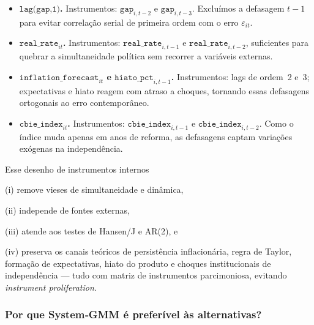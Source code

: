 \documentclass[a4paper,12pt]{article}[abnt2]
\begin{document}
\begin{itemize}
  \item \textbf{\(\texttt{lag(gap,1)}\).}  
        Instrumentos: \(\texttt{gap}_{i,t-2}\) e \(\texttt{gap}_{i,t-3}\).  
        Excluímos a defasagem \(t-1\) para evitar correlação serial de
        primeira ordem com o erro \(\varepsilon_{it}\).

  \item \textbf{\(\texttt{real\_rate}_{it}\).}  
        Instrumentos: \(\texttt{real\_rate}_{i,t-1}\) e
        \(\texttt{real\_rate}_{i,t-2}\), suficientes para quebrar a
        simultaneidade política sem recorrer a variáveis externas.

  \item \textbf{\(\texttt{inflation\_forecast}_{it}\) e
        \(\texttt{hiato\_pct}_{i,t-1}\).}  
        Instrumentos: lags de ordem 2 e 3; expectativas e hiato reagem com
        atraso a choques, tornando essas defasagens ortogonais ao erro
        contemporâneo.

  \item \textbf{\(\texttt{cbie\_index}_{it}\).}  
        Instrumentos: \(\texttt{cbie\_index}_{i,t-1}\) e
        \(\texttt{cbie\_index}_{i,t-2}\).  
        Como o índice muda apenas em anos de reforma, as defasagens captam
        variações exógenas na independência.
\end{itemize}

Esse desenho de instrumentos internos

(i) remove vieses de simultaneidade e dinâmica,  

(ii) independe de fontes externas,  

(iii) atende aos testes de Hansen/J e AR(2), e  

(iv) preserva os canais teóricos de persistência inflacionária, regra de
Taylor, formação de expectativas, hiato do produto e choques institucionais
de independência — tudo com matriz de instrumentos parcimoniosa, evitando
\textit{instrument proliferation}.

\subsubsection{\textbf{Por que System‑GMM é preferível às alternativas?}}
\end{document}
